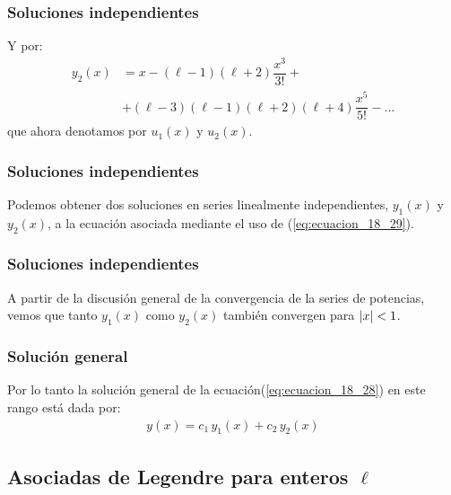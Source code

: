 \documentclass[12pt]{beamer}
\begin{document}
\begin{frame}
\frametitle{Soluciones independientes}
Y por:
\pause
\begin{align*}
y_{2} (x) &= x - (\ell - 1)(\ell + 2) \dfrac{x^{3}}{3!} + \\[0.5em]
&+ (\ell - 3) (\ell - 1)(\ell + 2)(\ell + 4) \dfrac{x^{5}}{5!} - \ldots
\end{align*}
que ahora denotamos por $u_{1} (x)$ y $u_{2}(x)$.
\end{frame}
\begin{frame}
\frametitle{Soluciones independientes}
Podemos obtener dos soluciones en series linealmente independientes, $y_{1} (x)$ y $y_{2} (x)$, a la ecuación asociada mediante el uso de (\ref{eq:ecuacion_18_29}). 
\end{frame}
\begin{frame}
\frametitle{Soluciones independientes}
A partir de la discusión general de la convergencia de la series de potencias, vemos que tanto $y_{1} (x)$ como $y_{2} (x)$ también convergen para $\abs{x} < 1$.
\end{frame}
\begin{frame}
\frametitle{Solución general}
Por lo tanto la solución general de la ecuación(\ref{eq:ecuacion_18_28}) en este rango está dada por:
\pause
\begin{align*}
y(x) = c_{1} \, y_{1} (x) + c_{2} \, y_{2} (x)
\end{align*}
\end{frame}

\subsection{Asociadas de Legendre para enteros $\ell$}
\end{document}
